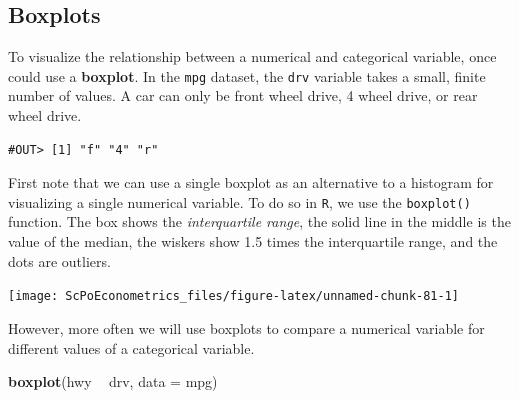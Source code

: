 \documentclass[]{book}
\newenvironment{Shaded}{\begin{snugshade}}{\end{snugshade}}
\newcommand{\DataTypeTok}[1]{\textcolor[rgb]{0.13,0.29,0.53}{#1}}
\newcommand{\KeywordTok}[1]{\textcolor[rgb]{0.13,0.29,0.53}{\textbf{#1}}}
\newcommand{\NormalTok}[1]{#1}
\newcommand{\OperatorTok}[1]{\textcolor[rgb]{0.81,0.36,0.00}{\textbf{#1}}}
\newcommand{\StringTok}[1]{\textcolor[rgb]{0.31,0.60,0.02}{#1}}
\begin{document}
\hypertarget{boxplots}{%
\subsection{Boxplots}\label{boxplots}}

To visualize the relationship between a numerical and categorical variable, once could use a \textbf{boxplot}. In the \texttt{mpg} dataset, the \texttt{drv} variable takes a small, finite number of values. A car can only be front wheel drive, 4 wheel drive, or rear wheel drive.

\begin{Shaded}
\end{Shaded}

\begin{verbatim}
#OUT> [1] "f" "4" "r"
\end{verbatim}

First note that we can use a single boxplot as an alternative to a histogram for visualizing a single numerical variable. To do so in \texttt{R}, we use the \texttt{boxplot()} function. The box shows the \emph{interquartile range}, the solid line in the middle is the value of the median, the wiskers show 1.5 times the interquartile range, and the dots are outliers.

\begin{Shaded}
\end{Shaded}

\begin{center}\texttt{[image: ScPoEconometrics\_files/figure-latex/unnamed-chunk-81-1]} \end{center}

However, more often we will use boxplots to compare a numerical variable for different values of a categorical variable.

\begin{Shaded}
\begin{Highlighting}[]
\KeywordTok{boxplot}\NormalTok{(hwy }\OperatorTok{~}\StringTok{ }\NormalTok{drv, }\DataTypeTok{data =}\NormalTok{ mpg)}
\end{Highlighting}
\end{Shaded}
\end{document}
